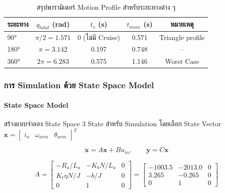 \begin{table}[H]
  \centering
  \caption{สรุปพารามิเตอร์ Motion Profile สำหรับระยะทางต่าง ๆ}
  \label{tab:motion_summary}
  \begin{tabular}{lcccc}
    \toprule
    ระยะทาง & $q_{total}$ (rad) & $t_v$ (s) & $t_{move}$ (s) & หมายเหตุ \\
    \midrule
    90°  & $\pi/2 = 1.571$ & 0 (ไม่มี Cruise) & 0.571 & Triangle profile \\
    180° & $\pi = 3.142$   & 0.197            & 0.748 & -- \\
    360° & $2\pi = 6.283$  & 0.575            & 1.146 & Worst Case \\
    \bottomrule
  \end{tabular}
\end{table}

\subsubsection{การ Simulation ด้วย State Space Model}
\label{subsubsec:state_space_simulation}

\paragraph{State Space Model}

สร้างแบบจำลอง State Space 3 State สำหรับ Simulation
โดยเลือก State Vector $\mathbf{x} = \begin{bmatrix} i_a & \omega_{arm} & \theta_{arm} \end{bmatrix}^T$

\begin{equation}
  \dot{\mathbf{x}} = A\mathbf{x} + Bu_{in}, \qquad \mathbf{y} = C\mathbf{x}
  \label{eq:ss}
\end{equation}

\begin{equation}
  A = \begin{bmatrix}
        -R_a/L_a       & -K_b N/L_a & 0 \\
        K_t\eta N/J    & -b/J       & 0 \\
        0              & 1          & 0
      \end{bmatrix}
    = \begin{bmatrix}
        -1003.5 & -2013.0 & 0 \\
        3.265   & -0.265  & 0 \\
        0       & 1       & 0
      \end{bmatrix}
  \label{eq:A_matrix}
\end{equation}

